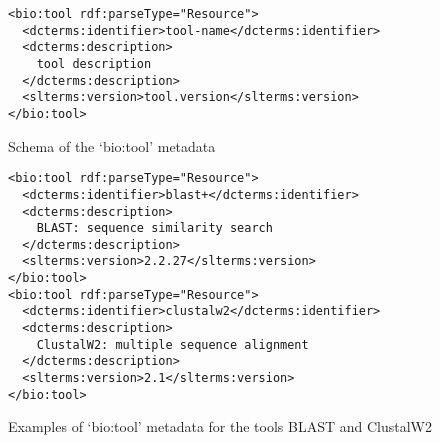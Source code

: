 \begin{figure}
\scriptsize
 \begin{center}
    \begin{verbatim}
<bio:tool rdf:parseType="Resource">
  <dcterms:identifier>tool-name</dcterms:identifier>
  <dcterms:description>
    tool description
  </dcterms:description>
  <slterms:version>tool.version</slterms:version>
</bio:tool>
    \end{verbatim}
  \end{center}
 \caption{Schema of the `bio:tool' metadata}
 \label{fig:biotool-schema}
\end{figure}


\begin{figure}
\scriptsize
 \begin{center}
    \begin{verbatim}
<bio:tool rdf:parseType="Resource">
  <dcterms:identifier>blast+</dcterms:identifier>
  <dcterms:description>
    BLAST: sequence similarity search
  </dcterms:description>
  <slterms:version>2.2.27</slterms:version>
</bio:tool>
<bio:tool rdf:parseType="Resource">
  <dcterms:identifier>clustalw2</dcterms:identifier>
  <dcterms:description>
    ClustalW2: multiple sequence alignment
  </dcterms:description>
  <slterms:version>2.1</slterms:version>
</bio:tool>
    \end{verbatim}
  \end{center}
 \caption{Examples of `bio:tool' metadata for the tools BLAST and ClustalW2}
 \label{fig:biotool-example}
\end{figure}
